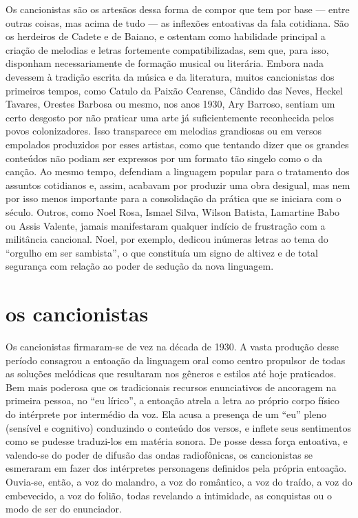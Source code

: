 Os cancionistas são os artesãos dessa forma de compor que tem por base
--- entre outras coisas, mas acima de tudo --- as inflexões entoativas
da fala cotidiana. São os herdeiros de Cadete e de Baiano, e ostentam
como habilidade principal a criação de melodias e letras fortemente
compatibilizadas, sem que, para isso, disponham necessariamente de
formação musical ou literária. Embora nada devessem à tradição escrita
da música e da literatura, muitos cancionistas dos primeiros tempos,
como Catulo da Paixão Cearense, Cândido das Neves, Heckel Tavares,
Orestes Barbosa ou mesmo, nos anos 1930, Ary Barroso, sentiam um certo
desgosto por não praticar uma arte já suficientemente reconhecida pelos
povos colonizadores. Isso transparece em melodias grandiosas ou em
versos empolados produzidos por esses artistas, como que tentando dizer
que os grandes conteúdos não podiam ser expressos por um formato tão
singelo como o da canção. Ao mesmo tempo, defendiam a linguagem popular
para o tratamento dos assuntos cotidianos e, assim, acabavam por
produzir uma obra desigual, mas nem por isso menos importante para a
consolidação da prática que se iniciara com o século. Outros, como Noel
Rosa, Ismael Silva, Wilson Batista, Lamartine Babo ou Assis Valente,
jamais manifestaram qualquer indício de frustração com a militância
cancional. Noel, por exemplo, dedicou inúmeras letras ao tema do
``orgulho em ser sambista'', o que constituía um signo de altivez e de
total segurança com relação ao poder de sedução da nova linguagem.

\section{os cancionistas}

Os cancionistas firmaram-se de vez na década de 1930. A vasta produção
desse período consagrou a entoação da linguagem oral como centro
propulsor de todas as soluções melódicas que resultaram nos gêneros e
estilos até hoje praticados. Bem mais poderosa que os tradicionais
recursos enunciativos de ancoragem na primeira pessoa, no ``eu lírico'',
a entoação atrela a letra ao próprio corpo físico do intérprete por
intermédio da voz. Ela acusa a presença de um ``eu'' pleno (sensível e
cognitivo) conduzindo o conteúdo dos versos, e inflete seus sentimentos
como se pudesse traduzi-los em matéria sonora. De posse dessa força
entoativa, e valendo-se do poder de difusão das ondas radiofônicas, os
cancionistas se esmeraram em fazer dos intérpretes personagens definidos
pela própria entoação. Ouvia-se, então, a voz do malandro, a voz do
romântico, a voz do traído, a voz do embevecido, a voz do folião, todas
revelando a intimidade, as conquistas ou o modo de ser do enunciador.

